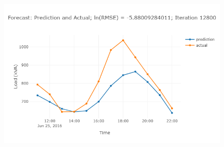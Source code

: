 \begin{figure}
\centering
\includegraphics[width=0.95\linewidth]{"images/prelim-plots/newplot (9)"}
\caption{}
\end{figure}

